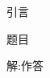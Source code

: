 \documentclass{article}
\begin{document}
    \thispagestyle{fancy}
    \fancyhead{}
    \chead{}
    \rhead{}
    \lfoot{}
    \cfoot{\thepage}   %
    \rfoot{}
    \renewcommand{\headrulewidth}{0.2pt}
    \renewcommand{\footrulewidth}{0pt}


	\large 引言

    \large 题目

	解:作答
\end{document}
